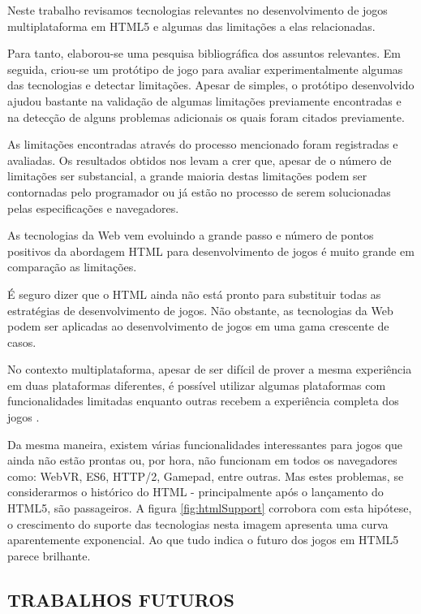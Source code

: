 
Neste trabalho revisamos tecnologias relevantes no desenvolvimento
de jogos multiplataforma em HTML5 e algumas das limitações a elas
relacionadas.

Para tanto, elaborou-se uma pesquisa bibliográfica
dos assuntos relevantes. Em seguida, criou-se um protótipo de jogo
para avaliar experimentalmente algumas das tecnologias e detectar
limitações. Apesar de simples, o protótipo desenvolvido ajudou
bastante na validação de algumas limitações previamente encontradas
e na detecção de alguns problemas adicionais os quais foram citados
previamente.

As limitações encontradas através do processo mencionado foram
registradas e avaliadas. Os resultados obtidos nos levam a crer que,
apesar de o número de limitações ser substancial, a grande maioria
destas limitações podem ser contornadas pelo programador ou já estão
no processo de serem solucionadas pelas especificações e navegadores.

As tecnologias da Web vem evoluindo a grande passo e número de pontos
positivos da abordagem HTML para desenvolvimento de jogos é muito
grande em comparação as limitações.

É seguro dizer que o HTML ainda não está pronto para substituir todas
as estratégias de desenvolvimento de jogos. Não obstante, as tecnologias
da Web podem ser aplicadas ao desenvolvimento de jogos em uma gama
crescente de casos.

No contexto multiplataforma, apesar de ser difícil de prover a
mesma experiência em duas plataformas diferentes, é possível
utilizar algumas plataformas com funcionalidades limitadas enquanto
outras recebem a experiência completa dos jogos \autocite[p.
1]{currentStateCrossPlatform}.


Da mesma maneira, existem várias funcionalidades interessantes para
jogos que ainda não estão prontas ou, por hora, não funcionam
em todos os navegadores como: WebVR, ES6, HTTP/2, Gamepad, entre
outras. Mas estes problemas, se considerarmos o histórico do HTML -
principalmente após o lançamento do HTML5, são passageiros. A figura
\ref{fig:htmlSupport} corrobora com esta hipótese, o crescimento do
suporte das tecnologias nesta imagem apresenta uma curva aparentemente
exponencial. Ao que tudo indica o futuro dos jogos em HTML5 parece
brilhante.

\subsection{TRABALHOS FUTUROS}

